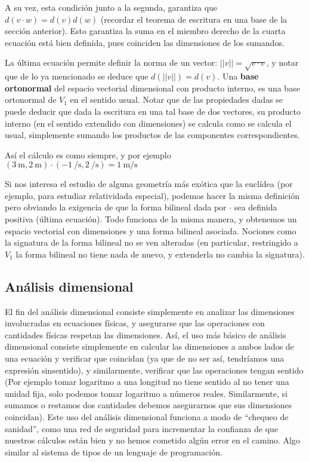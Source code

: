 \documentclass{article}
\begin{document}
A su vez, esta condición junto a la segunda, garantiza que $d(v \cdot w) = d(v) d(w)$ (recordar el teorema de escritura en una
base de la sección anterior). Esto garantiza la suma en el miembro derecho de la cuarta ecuación está bien definida, pues
coinciden las dimensiones de los sumandos.

La última ecuación permite definir la norma de un vector: $||v|| = \sqrt{v \cdot v}$, y notar que de lo ya mencionado
se deduce que $d(||v||) = d(v)$. Una \textbf{base ortonormal} del espacio vectorial dimensional con producto interno,
es una base ortonormal de $V_1$ en el sentido usual. Notar que de las propiedades dadas se puede deducir que dada la
escritura en una tal base de dos vectores, su producto interno (en el sentido extendido con dimensiones) se calcula
como se calcula el usual, simplemente sumando los productos de las componentes correspondientes.

Así el cálculo es como siempre, y por ejemplo $(\SI{3}{\meter}, \SI{2}{\meter}) \cdot (\SI{-1}{\per \second}, \SI{2}{\per \second}) = \SI{1}{\meter \per \second}$

Si nos interesa el estudio de alguna geometría más exótica que la euclídea (por ejemplo, para estudiar relatividada especial),
podemos hacer la misma definición pero obviando la exigencia de que la forma bilineal dada por $\cdot$ sea definida positiva (última ecuación).
Todo funciona de la misma manera, y obtenemos un espacio vectorial con dimensiones y una forma bilineal asociada. Nociones como
la signatura de la forma bilineal no se ven alteradas (en particular, restringido a $V_1$ la forma bilineal no tiene nada de nuevo,
y extenderla no cambia la signatura).

\subsection{Análisis dimensional}

El fin del análisis dimensional consiste simplemente en analizar las dimensiones involucradas en ecuaciones físicas, y asegurarse
que las operaciones con cantidades físicas respetan las
dimensiones. Así, el uso más básico de análisis dimensional consiste simplemente en calcular las dimensiones a ambos lados de
una ecuación y verificar que coincidan (ya que de no ser así, tendríamos una expresión sinsentido), y similarmente, verificar
que las operaciones tengan sentido (Por ejemplo tomar logaritmo a una longitud no tiene sentido al no tener una unidad fija,
solo podemos tomar logaritmo a números reales. Similarmente, si sumamos o restamos dos cantidades debemos asegurarnos que
sus dimensiones coincidan). Este uso del análisis dimensional funciona a modo de ``chequeo de sanidad'', como una red de seguridad
para incrementar la confianza de que nuestros cálculos están bien y no hemos cometido algún error en el camino. Algo similar
al sistema de tipos de un lenguaje de programación.
\end{document}
